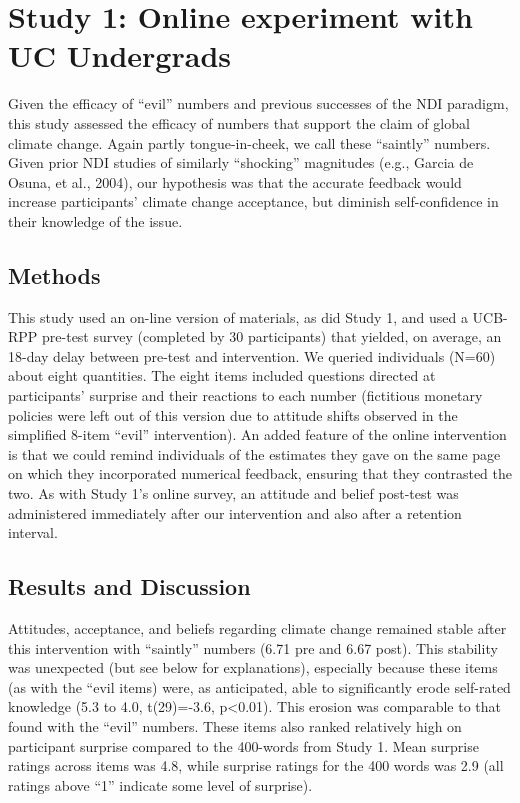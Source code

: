 \section{Study 1: Online experiment with UC Undergrads}

Given the efficacy of “evil” numbers and previous successes of the NDI paradigm,
this study assessed the efficacy of numbers that support the claim of global
climate change. Again partly tongue-in-cheek, we call these “saintly” numbers.
Given prior NDI studies of similarly “shocking” magnitudes (e.g., Garcia de
Osuna, et al., 2004), our hypothesis was that the accurate feedback would
increase participants’ climate change acceptance, but diminish self-confidence
in their knowledge of the issue.


\subsection{Methods}

This study used an on-line version of materials, as did Study 1, and used a
UCB-RPP pre-test survey (completed by 30 participants) that yielded, on average,
an 18-day delay between pre-test and intervention. We queried individuals (N=60)
about eight quantities. The eight items included questions directed at
participants’ surprise and their reactions to each number (fictitious monetary
policies were left out of this version due to attitude shifts observed in the
simplified 8-item “evil” intervention). An added feature of the online
intervention is that we could remind individuals of the estimates they gave on
the same page on which they incorporated numerical feedback, ensuring that they
contrasted the two. As with Study 1’s online survey, an attitude and belief
post-test was administered immediately after our intervention and also after a
retention interval.


\subsection{Results and Discussion}

Attitudes, acceptance, and beliefs regarding climate change remained stable
after this intervention with “saintly” numbers (6.71 pre and 6.67 post). This
stability was unexpected (but see below for explanations), especially because
these items (as with the “evil items) were, as anticipated, able to
significantly erode self-rated knowledge (5.3 to 4.0, t(29)=-3.6, p<0.01). This
erosion was comparable to that found with the “evil” numbers. These items also
ranked relatively high on participant surprise compared to the 400-words from
Study 1. Mean surprise ratings across items was 4.8, while surprise ratings for
the 400 words was 2.9 (all ratings above “1” indicate some level of surprise).


